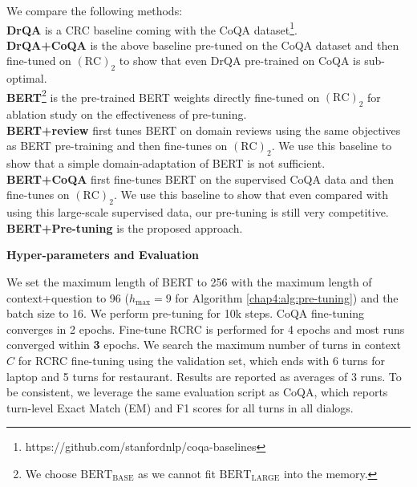 We compare the following methods: \\
\textbf{DrQA} is a CRC baseline coming with the CoQA dataset\footnote{https://github.com/stanfordnlp/coqa-baselines}. \\
\textbf{DrQA+CoQA} is the above baseline pre-tuned on the CoQA dataset and then fine-tuned on $(\text{RC})_2$ to show that even DrQA pre-trained on CoQA is sub-optimal.\\
\textbf{BERT}\footnote{We choose $\text{BERT}_{\text{BASE}}$ as we cannot fit $\text{BERT}_{\text{LARGE}}$ into the memory.} is the pre-trained BERT weights directly fine-tuned on $(\text{RC})_2$ for ablation study on the effectiveness of pre-tuning.\\
\textbf{BERT+review} first tunes BERT on domain reviews using the same objectives as BERT pre-training and then fine-tunes on $(\text{RC})_2$. We use this baseline to show that a simple domain-adaptation of BERT is not sufficient.\\
\textbf{BERT+CoQA} first fine-tunes BERT on the supervised CoQA data and then fine-tunes on $(\text{RC})_2$. We use this baseline to show that even compared with using this large-scale supervised data, our pre-tuning is still very competitive.\\
\textbf{BERT+Pre-tuning} is the proposed approach.

\textbf{Hyper-parameters and Evaluation}

We set the maximum length of BERT to 256 with the maximum length of context+question to 96 ($h_\text{max}=9$ for Algorithm \ref{chap4:alg:pre-tuning}) and the batch size to 16.
We perform pre-tuning for 10k steps. 
CoQA fine-tuning converges in 2 epochs.
Fine-tune RCRC is performed for 4 epochs and most runs converged within \textbf{3} epochs.
We search the maximum number of turns in context $C$ for RCRC fine-tuning using the validation set, which ends with 6 turns for laptop and 5 turns for restaurant.
Results are reported as averages of 3 runs.
To be consistent, we leverage the same evaluation script as CoQA, which reports 
turn-level Exact Match (EM) and F1 scores for all turns in all dialogs.

